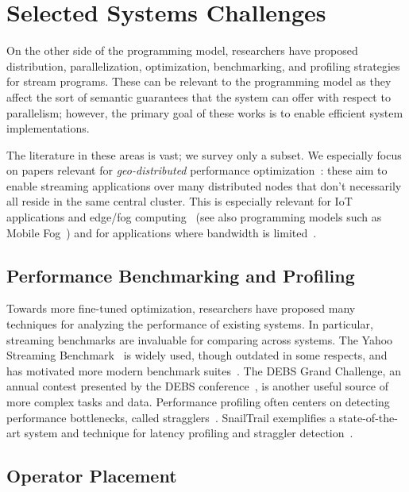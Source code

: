 \section{Selected Systems Challenges}

On the other side of the programming model,
researchers have proposed distribution, parallelization, optimization, benchmarking, and profiling strategies for stream programs.
These can be relevant to the programming model as they affect the sort of semantic guarantees that the system can offer with respect to parallelism;
however, the primary goal of these works is to enable efficient system implementations.

The literature in these areas is vast; we survey only a subset. We especially focus on papers relevant for \emph{geo-distributed} performance optimization~: these aim to enable streaming applications over many distributed nodes that don't necessarily all reside in the same central cluster.
This is especially relevant for IoT applications and edge/fog computing~\cite{satyanarayanan2017emergence,dastjerdi2016fog,shi2016edge,villari2016osmotic} (see also programming models such as Mobile Fog~\cite{hong2013mobile-fog})
and for applications where bandwidth is limited~\cite{vulimiri2015global-analytics,chienchun2018videoedge,zhang2018awstream}.

\subsection{Performance Benchmarking and Profiling}

Towards more fine-tuned optimization, researchers have proposed many techniques for analyzing the performance of existing systems.
In particular, streaming benchmarks are invaluable for comparing across systems.
The Yahoo Streaming Benchmark~\cite{yahoostreaming2016} is widely used,
though outdated in some respects, and has motivated more modern benchmark suites~\cite{bordin2020dspbench,lopez2016performance}.
The DEBS Grand Challenge, an annual contest presented by the DEBS conference~\cite{DEBS2006}, is another useful source of more complex tasks and data.
Performance profiling often centers on detecting performance bottlenecks, called stragglers~\cite{liu2020resource,khan2015empirical}.
SnailTrail exemplifies a state-of-the-art system and technique for latency profiling and straggler detection~\cite{hoffmann2018snailtrail}.

\subsection{Operator Placement}

